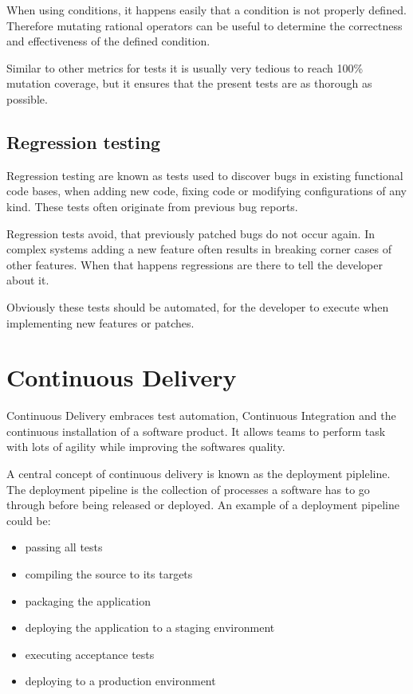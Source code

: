 When using conditions, it happens easily that a condition is not properly
defined. Therefore mutating rational operators can be useful to determine the
correctness and effectiveness of the defined condition.

Similar to other metrics for tests it is usually very tedious to reach 100\%
mutation coverage, but it ensures that the present tests are as thorough as
possible.

\subsection{Regression testing}

Regression testing are known as tests used to discover bugs in existing
functional code bases, when adding new code, fixing code or modifying
configurations of any kind. These tests often originate from previous bug
reports.

Regression tests avoid, that previously patched bugs do not occur again. In
complex systems adding a new feature often results in breaking corner cases of
other features. When that happens regressions are there to tell the developer
about it.

Obviously these tests should be automated, for the developer to execute when
implementing new features or patches.

\section{Continuous Delivery}

Continuous Delivery embraces test automation, Continuous Integration and the
continuous installation of a software product. It allows teams to perform task
with lots of agility while improving the softwares quality.

A central concept of continuous delivery is known as the deployment pipleline.
The deployment pipeline is the collection of processes a software has to go
through before being released or deployed. An example of a deployment pipeline
could be: 

\begin{itemize}
  \item{passing all tests}
  \item{compiling the source to its targets}
  \item{packaging the application}
  \item{deploying the application to a staging environment}
  \item{executing acceptance tests}
  \item{deploying to a production environment}
\end{itemize}

